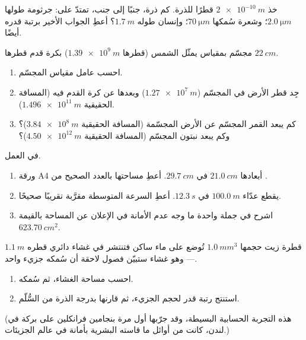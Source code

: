 \begin{exercise}[$\star\star$]\label{exo:g10:orders-of-magnitude:9}
خذ $\qty{2e-10}{m}$ قطرًا للذرة. كم ذرة، جنبًا إلى
جنب، تمتدّ على: جرثومة طولها $\qty{2.0}{\micro m}$؛ وشعرة سُمكها
$\qty{70}{\micro m}$؛ وإنسان طوله $\qty{1.7}{m}$؟ أعطِ الجواب الأخير
برتبة قدره أيضًا.
\end{exercise}

\begin{exercise}[$\star\star$]\label{exo:g10:orders-of-magnitude:10}
مجسّم بمقياس يمثّل الشمس (قطرها $\qty{1.39e9}{m}$) بكرة
قدم قطرها $\qty{22}{cm}$.
\begin{enumerate}
  \item احسب عامل مقياس المجسّم.
  \item جِد قطر الأرض في المجسّم ($\qty{1.27e7}{m}$) وبعدها
        عن كرة القدم فيه (المسافة الحقيقية
        $\qty{1.496e11}{m}$).
  \item كم يبعد القمر المجسّم عن الأرض المجسّمة (المسافة الحقيقية
        $\qty{3.84e8}{m}$)؟ وكم يبعد نبتون المجسّم (المسافة
        الحقيقية $\qty{4.50e12}{m}$)؟
\end{enumerate}
\end{exercise}

\begin{exercise}[$\star\star$]\label{exo:g10:orders-of-magnitude:11}
 في العمل.
\begin{enumerate}
  \item ورقة A4 أبعادها $\qty{21.0}{cm}$ في $\qty{29.7}{cm}$.
        أعطِ مساحتها بالعدد الصحيح من .
  \item يقطع عدّاء $\qty{100.0}{m}$ في $\qty{12.3}{s}$. أعطِ
        السرعة المتوسطة مقرَّبة تقريبًا صحيحًا.
  \item اشرح في جملة واحدة ما وجه عدم الأمانة في
        الإعلان عن المساحة بالقيمة $\qty{623.70}{cm^2}$.
\end{enumerate}
\end{exercise}

\begin{exercise}[$\star\star\star$]\label{exo:g10:orders-of-magnitude:12}
قطرة زيت حجمها $\qty{1.0}{mm^3}$ تُوضع على ماء ساكن
فتنتشر في غشاء دائري قطره $\qty{1.1}{m}$ --- وهو غشاء
ستبيّن فصول لاحقة أن سُمكه جزيء واحد.
\begin{enumerate}
  \item احسب مساحة الغشاء، ثم سُمكه.
  \item استنتج رتبة قدر لحجم الجزيء، ثم
        قارنها بدرجة الذرة من السُّلّم.
\end{enumerate}
(هذه التجربة الحسابية البسيطة، وقد جرّبها أول مرة بنجامين
فرانكلين على بركة في لندن، كانت من أوائل ما قاسته البشرية بأمانة
في عالم الجزيئات.)
\end{exercise}

